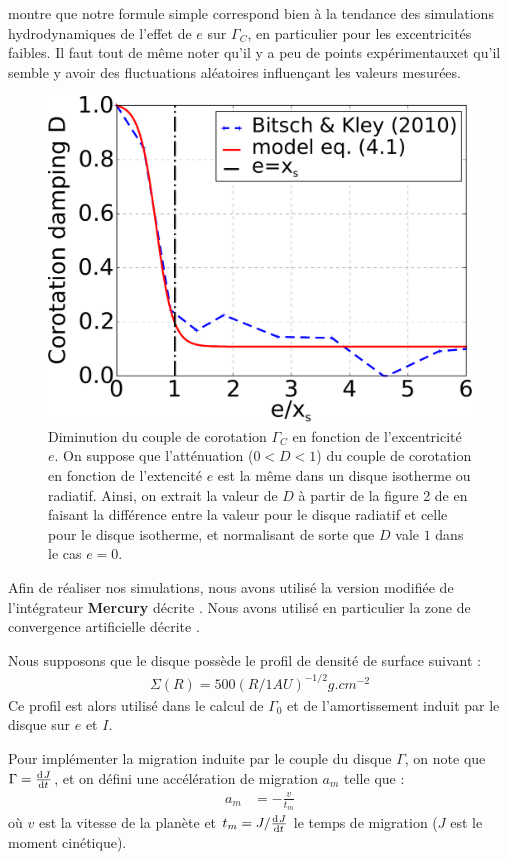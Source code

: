  montre que notre formule simple  correspond bien à la tendance des simulations hydrodynamiques de l'effet de $e$ sur $\Gamma_C$, en particulier pour les excentricités faibles. Il faut tout de même noter qu'il y a peu de points \og expérimentaux\fg et qu'il semble y avoir des fluctuations aléatoires influençant les valeurs mesurées.

\begin{figure}[htb]
\centering
\includegraphics[width=0.49\linewidth]{figure/shifted/corotation_damping_profile.pdf}
\caption{Diminution du couple de corotation $\Gamma_C$ en fonction de l'excentricité $e$. On suppose que l'atténuation ($0<D<1$) du couple de corotation en fonction de l'extencité $e$ est la même dans un disque isotherme ou radiatif. Ainsi, on extrait la valeur de $D$ à partir de la figure 2 de \cite{bitsch2010orbital} en faisant la différence entre la valeur pour le disque radiatif et celle pour le disque isotherme, et normalisant de sorte que $D$ vale $1$ dans le cas $e=0$.}\label{fig:shifted_CZ_D_profile}
\end{figure}

\bigskip

Afin de réaliser nos simulations, nous avons utilisé la version modifiée de l'intégrateur \textbf{Mercury}\citep{chambers1999hybrid} décrite . Nous avons utilisé en particulier la zone de convergence artificielle décrite . 

Nous supposons que le disque possède le profil de densité de surface suivant :
\begin{align}
\Sigma(R) = 500 \left(R/1\unit{AU}\right)^{-1/2} \unit{g.cm^{-2}}
\end{align}
Ce profil est alors utilisé dans le calcul de $\Gamma_0$ et de l'amortissement induit par le disque sur $e$ et $I$.

Pour implémenter la migration induite par le couple du disque $\Gamma$, on note que $\Gamma=\od{J}{t}$, et on défini une accélération de migration $a_m$ telle que\citep[eq. (14)]{cresswell2008three} :
\begin{align}
a_m &= - \frac{v}{t_m}
\end{align}
où $v$ est la vitesse de la planète et $t_m=J/\od{J}{t}$ le temps de migration ($J$ est le moment cinétique).

